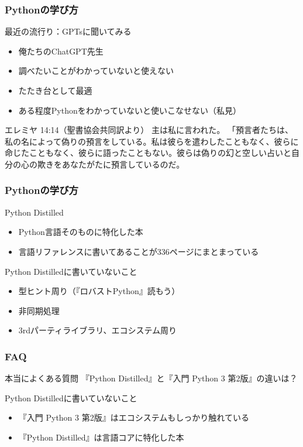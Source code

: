 \documentclass[aspectratio=169,dvipdfmx,12pt,notheorems]{beamer}
\theoremstyle{definition}
\begin{document}
\begin{frame}\frametitle{Pythonの学び方}

\begin{block}{最近の流行り：GPTsに聞いてみる}
\begin{itemize}
\item 俺たちのChatGPT先生
\item 調べたいことがわかっていないと使えない
\item たたき台として最適
\item ある程度Pythonをわかっていないと使いこなせない（私見）
\end{itemize}
\end{block}

\begin{exampleblock}{エレミヤ 14:14（聖書協会共同訳より）}
主は私に言われた。
「預言者たちは、私の名によって偽りの預言をしている。私は彼らを遣わしたこともなく、彼らに命じたこともなく、彼らに語ったこともない。彼らは偽りの幻と空しい占いと自分の心の欺きをあなたがたに預言しているのだ。
\end{exampleblock}

\end{frame}

\begin{frame}\frametitle{Pythonの学び方}

\begin{block}{Python Distilled}
\begin{itemize}
\item Python言語そのものに特化した本
\item 言語リファレンスに書いてあることが336ページにまとまっている
\end{itemize}
\end{block}

\begin{alertblock}{Python Distilledに書いていないこと}
\begin{itemize}
\item 型ヒント周り（『ロバストPython』読もう）
\item 非同期処理
\item 3rdパーティライブラリ、エコシステム周り
\end{itemize}
\end{alertblock}

\end{frame}

\begin{frame}\frametitle{FAQ}

\begin{exampleblock}{本当によくある質問}
『Python Distilled』と『入門 Python 3 第2版』の違いは？
\end{exampleblock}

\begin{block}{Python Distilledに書いていないこと}
\begin{itemize}
\item 『入門 Python 3 第2版』はエコシステムもしっかり触れている
\item 『Python Distilled』は言語コアに特化した本
\end{itemize}
\end{block}

\end{frame}
\end{document}
